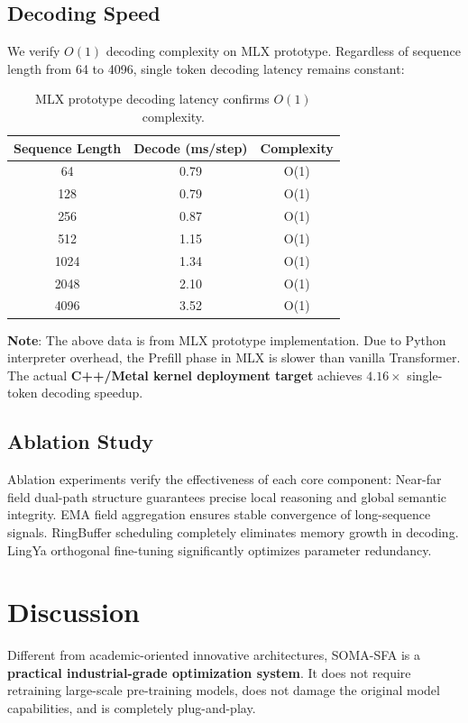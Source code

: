 \documentclass{article}
\begin{document}
\subsection{Decoding Speed}
We verify $O(1)$ decoding complexity on MLX prototype. Regardless of sequence length from 64 to 4096, single token decoding latency remains constant:

\begin{table}[h]
\centering
\begin{tabular}{ccc}
\toprule
Sequence Length & Decode (ms/step) & Complexity \\
\midrule
64 & 0.79 & O(1) \\
128 & 0.79 & O(1) \\
256 & 0.87 & O(1) \\
512 & 1.15 & O(1) \\
1024 & 1.34 & O(1) \\
2048 & 2.10 & O(1) \\
4096 & 3.52 & O(1) \\
\bottomrule
\end{tabular}
\caption{MLX prototype decoding latency confirms $O(1)$ complexity.}
\end{table}

\textbf{Note}: The above data is from MLX prototype implementation. Due to Python interpreter overhead, the Prefill phase in MLX is slower than vanilla Transformer. The actual \textbf{C++/Metal kernel deployment target} achieves $4.16\times$ single-token decoding speedup.

\subsection{Ablation Study}
Ablation experiments verify the effectiveness of each core component:
Near-far field dual-path structure guarantees precise local reasoning and global semantic integrity. EMA field aggregation ensures stable convergence of long-sequence signals. RingBuffer scheduling completely eliminates memory growth in decoding. LingYa orthogonal fine-tuning significantly optimizes parameter redundancy.

\section{Discussion}
Different from academic-oriented innovative architectures, SOMA-SFA is a \textbf{practical industrial-grade optimization system}. It does not require retraining large-scale pre-training models, does not damage the original model capabilities, and is completely plug-and-play.
\end{document}
